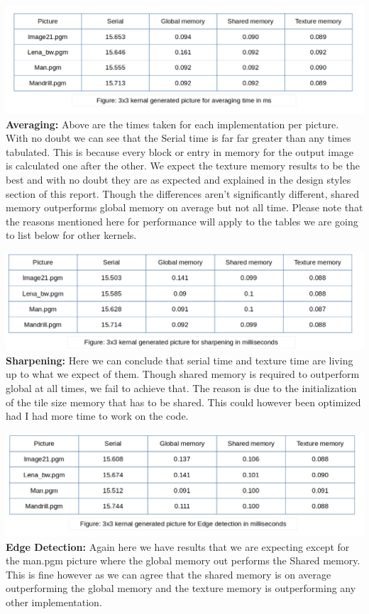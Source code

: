\includegraphics[scale=0.5]{Performance/averaging3.png}
\\
\textbf{Averaging: }Above are the times taken for each implementation per picture. With no doubt we can see that the Serial time is far far greater than any times tabulated. This is because every block or entry in memory for the output image is calculated one after the other.
We expect the texture memory results to be the best and with no doubt they are as expected and explained in the design styles section of this report. Though the differences aren't significantly different, shared memory outperforms global memory on average but not all time. Please note that the reasons mentioned here for performance will apply to the tables we are going to list below for other kernels.

\includegraphics[scale=0.5]{Performance/sharpening.png}
\textbf{Sharpening: }Here we can conclude that serial time and texture time are living up to what we expect of them. Though shared memory is required to outperform global at all times, we fail to achieve that. The reason is due to the initialization of the tile size memory that has to be shared. This could however been optimized had I had more time to work on the code. 

\includegraphics[scale=0.5]{Performance/edgeDetection.png}
\textbf{Edge Detection: }Again here we have results that we are expecting except for the man.pgm picture where the global memory out performs the Shared memory. This is fine however as we can agree that the shared memory is on average outperforming the global memory and the texture memory is outperforming any other implementation.
\\ \\ \\
